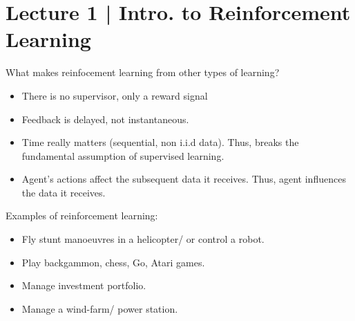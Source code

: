 \section{{Lecture 1 | Intro. to Reinforcement Learning}}

What makes reinfocement learning from other types of learning?
\begin{itemize}
\item There is no supervisor, only a reward signal
\item Feedback is delayed, not instantaneous.
\item Time really matters (sequential, non i.i.d data). Thus, breaks the fundamental assumption of supervised learning.
\item Agent's actions affect the subsequent data it receives. Thus, agent influences the data it receives.
\end{itemize}


Examples of reinforcement learning:
\begin{itemize}
    \item Fly stunt manoeuvres in a helicopter/ or control a robot.
    \item Play backgammon, chess, Go, Atari games.
    \item Manage investment portfolio.
    \item Manage a wind-farm/ power station.
\end{itemize}

